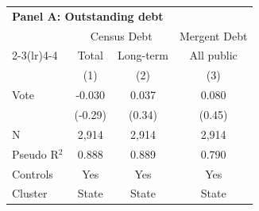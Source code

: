 \begingroup
\centering
\begin{tabular*}{\textwidth}{@{\extracolsep{\fill}}lccc}
\multicolumn{3}{l}{\textbf{Panel A: Outstanding debt}}\\

\addlinespace
   \toprule
                & \multicolumn{2}{c}{Census Debt} & \multicolumn{1}{c}{Mergent Debt}\\  
   \cmidrule(lr){2-3}\cmidrule(lr){4-4}
                & Total             & Long-term             & All public \\   
                & (1)               & (2)                   & (3)\\  
   \midrule 
   Vote         & -0.030            & 0.037                 & 0.080\\   
                & (-0.29)          & (0.34)               & (0.45)\\   
   \hline
   N & 2,914             & 2,914                 & 2,914\\  
   Pseudo R$^2$ & 0.888             & 0.889                 & 0.790\\  
   Controls                   & Yes & Yes & Yes\\
   Cluster              & State & State & State\\  
   \bottomrule
\end{tabular*}
\par\endgroup
